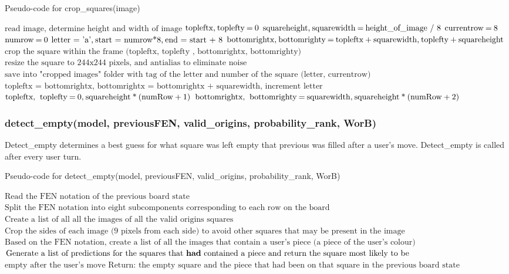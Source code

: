 \documentclass[onecolumn]{IEEEtran}
\begin{document}
\begin{algorithm}[H]
\caption{Pseudo-code for crop\_squares(image)}
\begin{algorithmic}[1]
\STATE $\text{read image, determine height and width of image}$
\STATE $\text{topleftx,\:toplefty\:=\:0}$ 
\STATE $\text{squareheight,\:squarewidth\:=\:height\_of\_image / 8}$ 
\STATE $\text{currentrow\:=\:8}$
\STATE $\text{numrow\:=\:0}$
\STATE $\text{letter = 'a',\:start = numrow*8,\:end = start + 8}$
\STATE $\text{bottomrightx,\:bottomrighty\:=\:topleftx\:+\:squarewidth,\:toplefty\:+\:squareheight}$
\STATE $\text{crop the square within the frame (topleftx, toplefty , bottomrightx, bottomrighty)}$
\STATE $\text{resize the square to 244x244 pixels, and antialias to eliminate noise}$ 
\STATE $\text{save into "cropped images" folder with tag of the letter and number of the square (letter, currentrow)}$
\STATE $\text{topleftx = bottomrightx, bottomrightx = bottomrightx + squarewidth, increment letter}$
\ENDFOR
\STATE $\text{topleftx,\: toplefty\:=\:0,\:squareheight\:*\:(numRow\:+\:1)}$
\STATE $\text{bottomrightx,\: bottomrighty\:=\:squarewidth,\:squareheight\:*\:(numRow\:+\:2)}$
\ENDWHILE
\end{algorithmic}
\end{algorithm}

\subsubsection{detect\_empty(model, previousFEN, valid\_origins, probability\_rank, WorB)}
Detect\_empty determines a best guess for what square was left empty that previous was filled after a user's move. Detect\_empty is called after every user turn. 

\begin{algorithm}[H]
\caption{Pseudo-code for detect\_empty(model, previousFEN, valid\_origins, probability\_rank, WorB)}
\begin{algorithmic}[1]
\STATE $\text{Read the FEN notation of the previous board state}$
\STATE $\text{Split the FEN notation into eight subcomponents corresponding to each row on the board}$
\STATE $\text{Create a list of all all the images of all the valid origins squares}$
\STATE $\text{Crop the sides of each image (9 pixels from each side) to avoid other squares that may be present in the image}$
\STATE $\text{Based on the FEN notation, create a list of all the images that contain a user's piece (a piece of the user's colour)}$
\STATE $\text{Generate a list of predictions for the squares that \textbf{had} contained a piece and return the square most likely to be}$
\STATEx $\text{empty after the user's move}$
\STATE $\text{Return: the empty square and the piece that had been on that square in the previous board state}$
\end{algorithmic}
\end{algorithm}
\end{document}
